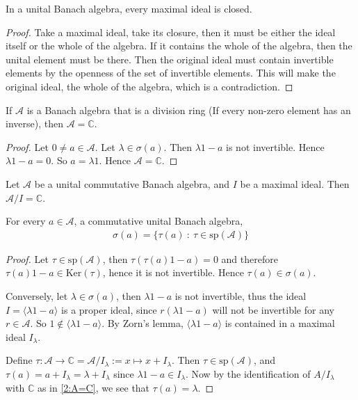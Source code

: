 \begin{lemma}
  In a unital Banach algebra, every maximal ideal is closed.
\end{lemma}
\begin{proof}
  Take a maximal ideal, take its closure, then it must be either the
  ideal itself or the whole of the algebra. If it contains the whole
  of the algebra, then the unital element must be there. Then the
  original ideal must contain invertible elements by the openness of
  the set of invertible elements. This will make the original ideal,
  the whole of the algebra, which is a contradiction.
\end{proof}

\begin{lemma}
  If $\mathcal{A}$ is a Banach algebra that is a division ring (If
  every non-zero element has an inverse), then
  $\mathcal{A} = \mathbb{C}$.
  \label{2:A=C}
\end{lemma}
\begin{proof}
  Let $0 \neq a \in \mathcal{A}$. Let $\lambda \in \sigma(a)$. Then
  $\lambda1 - a$ is not invertible. Hence $\lambda1 - a = 0$. So $a =
  \lambda 1$. Hence $\mathcal{A} = \mathbb{C}$.
\end{proof}

\begin{corollary}
  Let $\mathcal{A}$ be a unital commutative Banach algebra, and $I$
  be a maximal ideal. Then $\mathcal{A}/I = \mathbb{C}$.
\end{corollary}

\begin{lemma}
  \label{specturm_of_comm_alg_and_spectrum_of_element}
  For every $a \in \mathcal{A}$, a commutative unital Banach algebra,
  \begin{align*}
    \sigma(a) = \{ \tau(a)  \ : \   \tau \in \textrm{sp}(\mathcal{  A}) \}
  \end{align*}
\end{lemma}
\begin{proof}
  Let $\tau \in \textrm{sp}(\mathcal{A})$, then $\tau(\tau(a)1 -
  a) = 0$ and therefore $\tau(a)1 - a \in \textrm{Ker}(\tau)$,
  hence it is not invertible. Hence $\tau(a) \in \sigma(a)$.

  Conversely, let $ \lambda \in \sigma(a)$, then $\lambda 1 - a$ is
  not invertible, thus the ideal $I = \langle \lambda1 - a \rangle$
  is a proper ideal, since $r(\lambda 1 - a)$ will not be invertible
  for any $r \in \mathcal{A}$. So $1 \notin \langle \lambda1 - a
  \rangle$. By Zorn's lemma, $\langle \lambda1 -a \rangle $ is
  contained in a maximal ideal $I_\lambda$.

  Define $\tau: \mathcal{A} \to \mathbb{C} = \mathcal{A}/I_\lambda :=
  x \mapsto x + I_\lambda$. Then $\tau \in \textrm{sp}(\mathcal{A})$,
  and $\tau(a) = a + I_\lambda = \lambda + I_\lambda$ since
  $\lambda1 - a \in I_\lambda$. Now by the identification of $A/I_\lambda$
  with $\mathbb{C}$ as in \autoref{2:A=C}, we see that $\tau(a) =
  \lambda$.
\end{proof}

